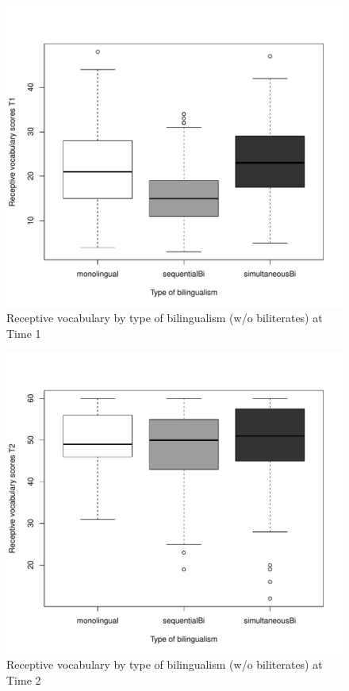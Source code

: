 \documentclass[output=paper,modfonts,nonflat,newtxmath]{langsci/langscibook}
\begin{document}
\begin{figure} %
\includegraphics[height=.45\textheight]{figures/PfenningerFigure5.pdf}
\caption{\label{fig:pfenninger:5} Receptive vocabulary by type of bilingualism (w/o biliterates) at Time 1}
\end{figure}

\begin{figure} %
\includegraphics[height=.45\textheight]{figures/PfenningerFigure6.pdf}
 \caption{\label{fig:pfenninger:6} Receptive vocabulary by type of bilingualism (w/o biliterates) at Time 2}
\end{figure}
\end{document}
